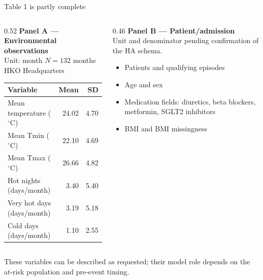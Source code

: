 \documentclass[aspectratio=169,10pt]{beamer}
\begin{document}
\begin{frame}{Table 1 is partly complete}
  \begin{columns}[T]
    \begin{column}{0.52\textwidth}
      {\color{LaidlawNavy}\textbf{Panel A --- Environmental observations}}\\[0.15em]
      {\footnotesize Unit: month \quad $N = 132$ months \quad HKO Headquarters}

      \vspace{0.35em}
      \footnotesize
      \begin{tabular}{@{}lrr@{}}
        \toprule
        Variable & Mean & SD \\
        \midrule
        Mean temperature ($^\circ$C) & 24.02 & 4.70 \\
        Mean Tmin ($^\circ$C) & 22.10 & 4.69 \\
        Mean Tmax ($^\circ$C) & 26.66 & 4.82 \\
        Hot nights (days/month) & 3.40 & 5.40 \\
        Very hot days (days/month) & 3.19 & 5.18 \\
        Cold days (days/month) & 1.10 & 2.55 \\
        \bottomrule
      \end{tabular}
    \end{column}
    \begin{column}{0.46\textwidth}
      {\color{LaidlawNavy}\textbf{Panel B --- Patient/admission}}\\[0.15em]
      {\footnotesize Unit and denominator pending confirmation of the HA schema.}

      \vspace{0.35em}
      \footnotesize
      \begin{itemize}
        \item Patients and qualifying episodes
        \item Age and sex
        \item Medication fields: diuretics, beta blockers, metformin, SGLT2 inhibitors
        \item BMI and BMI missingness
      \end{itemize}
    \end{column}
  \end{columns}

  \vspace{0.55em}
  \footnotesize
  These variables can be described as requested; their model role depends on
  the at-risk population and pre-event timing.
\end{frame}
\end{document}
